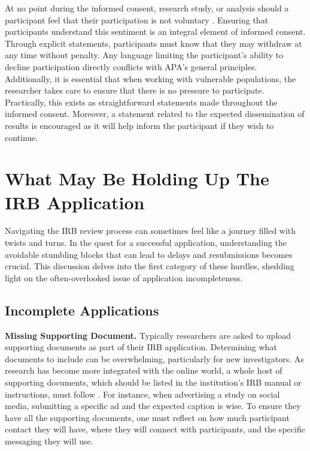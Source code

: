 \documentclass[
  11pt,
]{book}
\begin{document}
At no point during the informed consent, research study, or analysis should a participant feel that their participation is not voluntary \citetext{\citealp[Section 8.03]{american_psychological_association_ethical_2017}; \citealp[Part C]{national_commission_for_the_protection_of_human_subjects_of_biomedical_and_behavioral_research_belmont_1979}}. Ensuring that participants understand this sentiment is an integral element of informed consent. Through explicit statements, participants must know that they may withdraw at any time without penalty. Any language limiting the participant's ability to decline participation directly conflicts with APA's general principles. Additionally, it is essential that when working with vulnerable populations, the researcher takes care to ensure that there is no pressure to participate. Practically, this exists as straightforward statements made throughout the informed consent. Moreover, a statement related to the expected dissemination of results is encouraged as it will help inform the participant if they wish to continue.

\section{What May Be Holding Up The IRB Application}\label{what-may-be-holding-up-the-irb-application}

Navigating the IRB review process can sometimes feel like a journey filled with twists and turns. In the quest for a successful application, understanding the avoidable stumbling blocks that can lead to delays and resubmissions becomes crucial. This discussion delves into the first category of these hurdles, shedding light on the often-overlooked issue of application incompleteness.

\subsection{Incomplete Applications}\label{incomplete-applications}

\textbf{Missing Supporting Document.} Typically researchers are asked to upload supporting documents as part of their IRB application. Determining what documents to include can be overwhelming, particularly for new investigators. As research has become more integrated with the online world, a whole host of supporting documents, which should be listed in the institution's IRB manual or instructions, must follow \citep{rothwell_informed_2021, salmons_doing_2016}. For instance, when advertising a study on social media, submitting a specific ad and the expected caption is wise. To ensure they have all the supporting documents, one must reflect on how much participant contact they will have, where they will connect with participants, and the specific messaging they will use.
\end{document}
